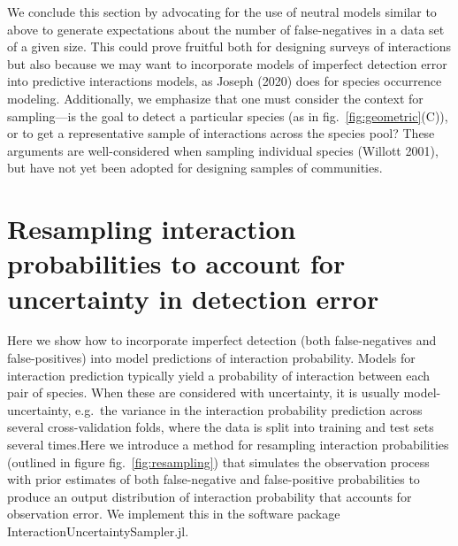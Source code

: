 \documentclass[11pt]{article}
\begin{document}
We conclude this section by advocating for the use of neutral models
similar to above to generate expectations about the number of
false-negatives in a data set of a given size. This could prove fruitful
both for designing surveys of interactions but also because we may want
to incorporate models of imperfect detection error into predictive
interactions models, as Joseph (2020) does for species occurrence
modeling. Additionally, we emphasize that one must consider the context
for sampling---is the goal to detect a particular species (as in
fig.~\ref{fig:geometric}(C)), or to get a representative sample of
interactions across the species pool? These arguments are
well-considered when sampling individual species (Willott 2001), but
have not yet been adopted for designing samples of communities.

\hypertarget{resampling-interaction-probabilities-to-account-for-uncertainty-in-detection-error}{%
\section{Resampling interaction probabilities to account for uncertainty
in detection
error}\label{resampling-interaction-probabilities-to-account-for-uncertainty-in-detection-error}}

Here we show how to incorporate imperfect detection (both
false-negatives and false-positives) into model predictions of
interaction probability. Models for interaction prediction typically
yield a probability of interaction between each pair of species. When
these are considered with uncertainty, it is usually model-uncertainty,
e.g.~the variance in the interaction probability prediction across
several cross-validation folds, where the data is split into training
and test sets several times.Here we introduce a method for resampling
interaction probabilities (outlined in figure fig.~\ref{fig:resampling})
that simulates the observation process with prior estimates of both
false-negative and false-positive probabilities to produce an output
distribution of interaction probability that accounts for observation
error. We implement this in the software package
InteractionUncertaintySampler.jl.
\end{document}
